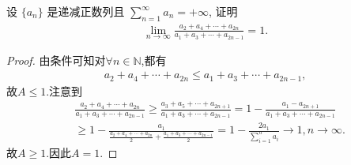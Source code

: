 \documentclass[../../main.tex]{subfiles}
\begin{document}
\begin{example}
设 $\{a_n\}$ 是递减正数列且 $\sum\limits_{n=1}^{\infty}a_n = +\infty$, 证明
\begin{align*}
\lim_{n\rightarrow \infty}\frac{a_2+a_4+\cdots +a_{2n}}{a_1+a_3+\cdots +a_{2n-1}} = 1.
\end{align*}
\end{example}
\begin{proof}
由条件可知对$\forall n\in \mathbb{N}$,都有
\begin{align*}
a_2+a_4+\cdots +a_{2n}\leqslant a_1+a_3+\cdots +a_{2n-1},
\end{align*}
故$A\leqslant 1$.注意到
\begin{align*}
&\frac{a_2+a_4+\cdots +a_{2n}}{a_1+a_3+\cdots +a_{2n-1}}\geqslant \frac{a_3+a_5+\cdots +a_{2n+1}}{a_1+a_3+\cdots +a_{2n-1}}=1-\frac{a_1-a_{2n+1}}{a_1+a_3+\cdots +a_{2n-1}}
\\
&\geqslant 1-\frac{a_1}{\frac{a_2+a_4+\cdots +a_{2n}}{2}+\frac{a_1+a_3+\cdots +a_{2n-1}}{2}}=1-\frac{2a_1}{\sum\limits_{i=1}^n{a_i}}\rightarrow 1,n\rightarrow \infty .
\end{align*}
故$A\geqslant 1$.因此$A=1$.

\end{proof}
\end{document}
